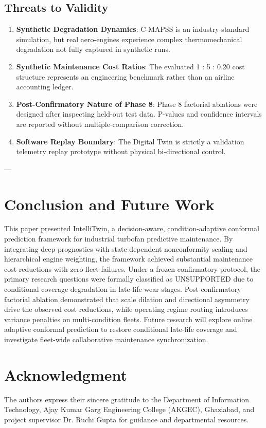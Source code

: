 \documentclass[conference]{IEEEtran}
\begin{document}
\subsection{Threats to Validity}
\begin{enumerate}
    \item \textbf{Synthetic Degradation Dynamics}: C-MAPSS is an industry-standard simulation, but real aero-engines experience complex thermomechanical degradation not fully captured in synthetic runs.
    \item \textbf{Synthetic Maintenance Cost Ratios}: The evaluated 1 : 5 : 0.20 cost structure represents an engineering benchmark rather than an airline accounting ledger.
    \item \textbf{Post-Confirmatory Nature of Phase 8}: Phase 8 factorial ablations were designed after inspecting held-out test data. P-values and confidence intervals are reported without multiple-comparison correction.
    \item \textbf{Software Replay Boundary}: The Digital Twin is strictly a validation telemetry replay prototype without physical bi-directional control.
\end{enumerate}

---

\section{Conclusion and Future Work}

This paper presented IntelliTwin, a decision-aware, condition-adaptive conformal prediction framework for industrial turbofan predictive maintenance. By integrating deep prognostics with state-dependent nonconformity scaling and hierarchical engine weighting, the framework achieved substantial maintenance cost reductions with zero fleet failures. Under a frozen confirmatory protocol, the primary research questions were formally classified as UNSUPPORTED due to conditional coverage degradation in late-life wear stages. Post-confirmatory factorial ablation demonstrated that scale dilation and directional asymmetry drive the observed cost reductions, while operating regime routing introduces variance penalties on multi-condition fleets. Future research will explore online adaptive conformal prediction to restore conditional late-life coverage and investigate fleet-wide collaborative maintenance synchronization.

\section*{Acknowledgment}
The authors express their sincere gratitude to the Department of Information Technology, Ajay Kumar Garg Engineering College (AKGEC), Ghaziabad, and project supervisor Dr. Ruchi Gupta for guidance and departmental resources.



\end{document}
